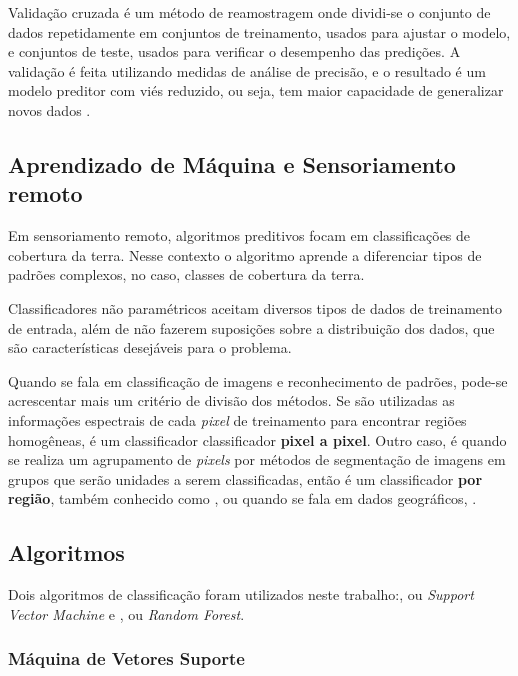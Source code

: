 Validação cruzada é um método de reamostragem onde dividi-se o
conjunto de dados repetidamente em conjuntos de treinamento, usados para
ajustar o modelo, e conjuntos de teste, usados para verificar o
desempenho das predições. A validação é feita utilizando medidas de
análise de precisão, e o resultado é um modelo preditor com viés
reduzido, ou seja, tem maior capacidade de generalizar novos dados
\cite{geocompr,james2013introduction}.

\subsection{Aprendizado de Máquina e Sensoriamento
remoto}\label{aprendizado-de-muxe1quina-e-sensoriamento-remoto}

Em sensoriamento remoto, algoritmos preditivos focam em classificações
de cobertura da terra. Nesse contexto o algoritmo aprende a diferenciar tipos de padrões complexos, no caso, classes de cobertura da
terra. \cite{waske2009machine}

Classificadores não paramétricos aceitam diversos tipos de dados de
treinamento de entrada, além de não fazerem suposições sobre a
distribuição dos dados, que são características desejáveis para o
problema. \cite{maxwell}

Quando se fala em classificação de imagens e reconhecimento de
padrões, pode-se acrescentar mais um critério de divisão dos métodos. Se são utilizadas as informações espectrais de cada \emph{pixel} de
treinamento para encontrar regiões homogêneas, é um classificador
classificador \textbf{pixel a pixel}. Outro caso, é quando se realiza um
agrupamento de \emph{pixels} por métodos de segmentação de imagens em
grupos que serão unidades a serem classificadas, então é um
classificador \textbf{por região}, também conhecido como , ou quando
se fala em dados geográficos, . \cite{meneses2012introduccao,lu-weng}

\subsection{Algoritmos}\label{algoritmos}

Dois algoritmos de classificação foram utilizados neste
trabalho:, ou \emph{Support Vector
Machine} e , ou \emph{Random Forest}.

\subsubsection{Máquina de Vetores
Suporte}\label{muxe1quina-de-vetores-suporte}

